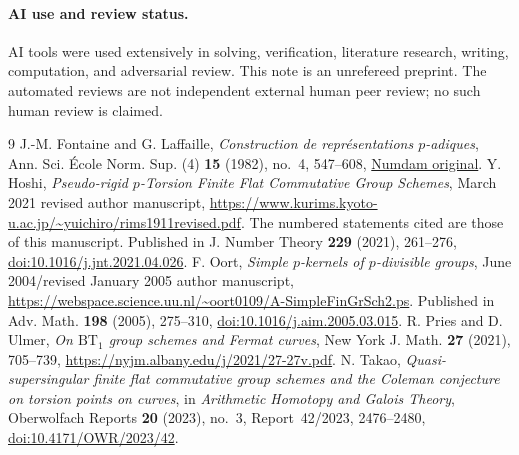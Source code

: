 \documentclass[10pt]{article}
\begin{document}
\paragraph{AI use and review status.}
AI tools were used extensively in solving, verification, literature
research, writing, computation, and adversarial review. This note
is an unrefereed preprint. The automated reviews are not independent
external human peer review; no such human review is claimed.

\begin{thebibliography}{9}
J.-M. Fontaine and G. Laffaille,
\emph{Construction de repr\'esentations $p$-adiques},
Ann. Sci. \'Ecole Norm. Sup. (4) \textbf{15} (1982), no.~4,
547--608,
\href{https://www.numdam.org/item/ASENS_1982_4_15_4_547_0/}{Numdam original}.
Y. Hoshi, \emph{Pseudo-rigid $p$-Torsion Finite Flat Commutative
Group Schemes}, March 2021 revised author manuscript,
\url{https://www.kurims.kyoto-u.ac.jp/~yuichiro/rims1911revised.pdf}.
The numbered statements cited are those of this manuscript.
Published in J. Number Theory \textbf{229} (2021), 261--276,
\href{https://doi.org/10.1016/j.jnt.2021.04.026}{doi:10.1016/j.jnt.2021.04.026}.
F. Oort, \emph{Simple $p$-kernels of $p$-divisible groups},
June 2004/revised January 2005 author manuscript,
\url{https://webspace.science.uu.nl/~oort0109/A-SimpleFinGrSch2.ps}.
Published in Adv. Math. \textbf{198} (2005), 275--310,
\href{https://doi.org/10.1016/j.aim.2005.03.015}{doi:10.1016/j.aim.2005.03.015}.
R. Pries and D. Ulmer, \emph{On $\mathrm{BT}_1$ group schemes and
Fermat curves}, New York J. Math. \textbf{27} (2021), 705--739,
\url{https://nyjm.albany.edu/j/2021/27-27v.pdf}.
N. Takao, \emph{Quasi-supersingular finite flat commutative group
schemes and the Coleman conjecture on torsion points on curves},
in \emph{Arithmetic Homotopy and Galois Theory},
Oberwolfach Reports \textbf{20} (2023), no.~3,
Report~42/2023, 2476--2480,
\href{https://doi.org/10.4171/OWR/2023/42}{doi:10.4171/OWR/2023/42}.
\end{thebibliography}
\end{document}
